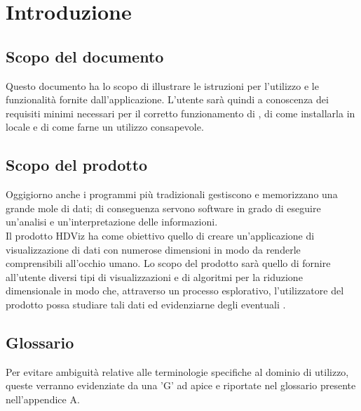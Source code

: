 \section{Introduzione}
\subsection{Scopo del documento}
Questo documento ha lo scopo di illustrare le istruzioni per l'utilizzo e le funzionalità fornite dall'applicazione. L'utente sarà quindi a conoscenza dei requisiti minimi necessari per il corretto funzionamento di \NomeProgetto{}, di come installarla in locale e di come farne un utilizzo consapevole.

\subsection{Scopo del prodotto}
Oggigiorno anche i programmi più tradizionali gestiscono e memorizzano una grande mole di dati; di conseguenza servono software in grado di eseguire un'analisi e un'interpretazione delle informazioni.\\
Il prodotto HDViz ha come obiettivo quello di creare un'applicazione di visualizzazione di dati con numerose dimensioni in modo da renderle comprensibili all'occhio umano.  Lo scopo del prodotto sarà quello di fornire all'utente diversi tipi di visualizzazioni e di algoritmi per la riduzione dimensionale in modo che, attraverso un processo esplorativo, l'utilizzatore del prodotto possa studiare tali dati ed evidenziarne degli eventuali . 

\subsection{Glossario}
Per evitare ambiguità relative alle terminologie specifiche al dominio di utilizzo, queste verranno evidenziate da una 'G' ad apice e riportate nel glossario presente nell'appendice A.

